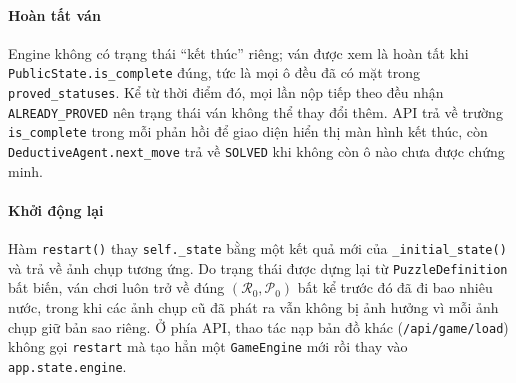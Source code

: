\begin{sloppypar}
\paragraph{Hoàn tất ván}
Engine không có trạng thái ``kết thúc'' riêng; ván được xem là hoàn tất khi
\texttt{PublicState.is\_complete} đúng, tức là mọi ô đều đã có mặt trong
\texttt{proved\_statuses}. Kể từ thời điểm đó, mọi lần nộp tiếp theo đều nhận
\texttt{ALREADY\_PROVED} nên trạng thái ván không thể thay đổi thêm. API trả về
trường \texttt{is\_complete} trong mỗi phản hồi để giao diện hiển thị màn hình
kết thúc, còn \texttt{DeductiveAgent.next\_move} trả về \texttt{SOLVED} khi không
còn ô nào chưa được chứng minh.

\paragraph{Khởi động lại}
Hàm \texttt{restart()} thay \texttt{self.\_state} bằng một kết quả mới của
\texttt{\_initial\_state()} và trả về ảnh chụp tương ứng. Do trạng thái được dựng
lại từ \texttt{PuzzleDefinition} bất biến, ván chơi luôn trở về đúng
$(\mathcal{R}_0, \mathcal{P}_0)$ bất kể trước đó đã đi bao nhiêu nước, trong khi
các ảnh chụp cũ đã phát ra vẫn không bị ảnh hưởng vì mỗi ảnh chụp giữ bản sao
riêng. Ở phía API, thao tác nạp bản đồ khác (\nolinkurl{/api/game/load}) không
gọi \texttt{restart} mà tạo hẳn một \texttt{GameEngine} mới rồi thay vào
\texttt{app.state.engine}.
\end{sloppypar}
